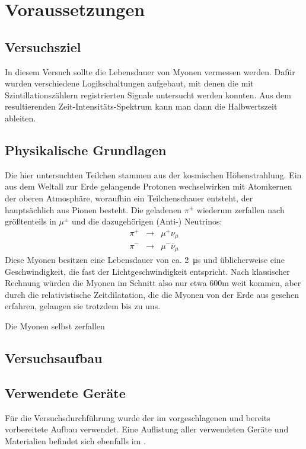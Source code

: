 \section{Voraussetzungen}

\subsection{Versuchsziel}

In diesem Versuch sollte die Lebensdauer von Myonen vermessen werden. Dafür
wurden verschiedene Logikschaltungen aufgebaut, mit denen die mit
Szintillationszählern registrierten Signale untersucht werden konnten. Aus dem
resultierenden Zeit-Intensitäts-Spektrum kann man dann die Halbwertszeit
ableiten.

\subsection{Physikalische Grundlagen}

Die hier untersuchten Teilchen stammen aus der kosmischen Höhenstrahlung. Ein
aus dem Weltall zur Erde gelangende Protonen wechselwirken mit Atomkernen der
oberen Atmosphäre, woraufhin ein Teilchenschauer entsteht, der hauptsächlich
aus Pionen besteht. Die geladenen $π^{\pm}$ wiederum zerfallen nach
\cite[Gl.16]{script} größtenteils in
$μ^{\pm}$ und die dazugehörigen (Anti-) Neutrinos:
\begin{eqnarray}
π^+ &\rightarrow& μ^+ ν_μ\\
π^- &\rightarrow& μ^- \overline{ν}_μ
\end{eqnarray}
Diese Myonen besitzen eine Lebensdauer von ca. \SI{2}{\micro\second} und
üblicherweise eine Geschwindigkeit, die fast der Lichtgeschwindigkeit
entspricht. Nach klassischer Rechnung würden die Myonen im Schnitt also nur
etwa 600m weit kommen, aber durch die relativistische Zeitdilatation, die die
Myonen von der Erde aus gesehen erfahren, gelangen sie trotzdem bis zu uns.

Die Myonen selbst zerfallen 
\subsection{Versuchsaufbau}



\subsection{Verwendete Geräte}

Für die Versuchsdurchführung wurde der im \cite{script} vorgeschlagenen und
bereits vorbereitete Aufbau verwendet. Eine Auflistung aller verwendeten
Geräte und Materialien befindet sich ebenfalls im \cite[Kap. 6]{script}.